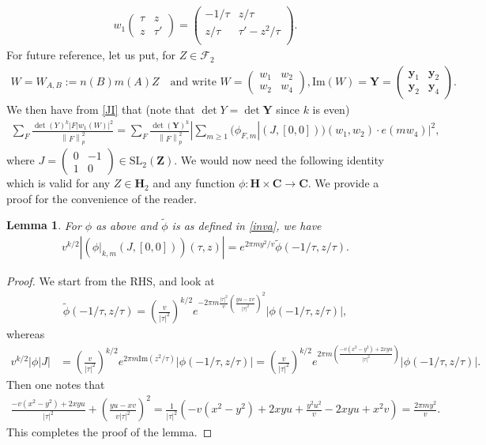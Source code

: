 \documentclass[11pt]{amsart}
\numberwithin{equation}{section}
\theoremstyle{plain}
\newtheorem{lem}[thm]{Lemma}
\theoremstyle{definition}
\newcommand{\mf}{\mathbf}
\newcommand{\mc}{\mathcal}
\newcommand{\mrm}{\mathrm}
\newcommand{\im}{\mrm{Im}}
\newcommand*{\abs}[1]{\left\lvert#1\right\rvert}
\newcommand*{\norm}[1]{\left\lVert#1\right\rVert}
\newcommand{\q}{\quad}
\newcommand{\smat}[4]{\left( \begin{smallmatrix}#1&#2\\#3&#4\end{smallmatrix}\right)}
\newcommand{\pmat}[4]{\begin{pmatrix} #1 & #2 \\ #3 & #4 \\ \end{pmatrix} }
\newcommand{\sltwo}{\mrm{SL}_2(\mf Z)}
\newcommand{\my}{\mf y}
\begin{document}
\begin{align}
     w_1 \begin{pmatrix}
\tau & z \\ z & \tau'
\end{pmatrix} = \pmat{- 1/\tau }{z/\tau}{z/\tau}{\tau'- z^2/\tau}.\label{JI}
\end{align}
For future reference, let us put, for $Z \in \mc F_2$
\begin{align}
    W = W_{A,B} := n(B) m(A) Z \q \text{and write  } W = \smat{w_1}{w_2}{w_2}{w_4}, \im(W)= \mf Y = \smat{\my_1}{\my_2}{\my_2}{\my_4}  .
\end{align}
We then have from \eqref{JI} that (note that $\det Y = \det \mf Y$ since $k$ is even)
\begin{align} \label{FtoFJ}
\sum_F \frac{\det(Y)^k |F|w_1(W)|^2}{\norm{F}^2_p} = \sum_F \frac{\det(\mf Y)^k}{\norm{F}^2_p} |\sum_{m \ge 1} (\phi_{F,m} |(J, [0,0]))(w_1,w_2) \cdot e(m w_4)|^2 ,
\end{align}
where $J=\smat{0}{-1}{1}{0}\in\sltwo$.
We would now need the following identity which is valid for any $ Z \in \mf H_2 $ and any function $\phi \colon \mf H \times \mf C \rightarrow \mf C$. We provide a proof for the convenience of the reader.
\begin{lem}
For $\phi$ as above and $\tilde{\phi}$ is as defined in \eqref{inva}, we have
\begin{align} \label{jeqiuvariance}
    v^{k/2} \abs{(\phi|_{k,m}(J, [0,0]))(\tau, z)} = e^{2\pi my^2/v} \widetilde{\phi}(-1/\tau, z/\tau).
\end{align}
\end{lem}
\begin{proof}
    We start from the RHS, and look at
\begin{align}
    \widetilde{\phi}(-1/\tau, z/\tau) = (\frac{v}{|\tau|^2})^{k/2} e^{- 2 \pi m \frac{|\tau|^2}{v} (\frac{yu-xv}{|\tau|^2})^2 } |\phi(-1/\tau,z/\tau)|,
\end{align}
whereas
\begin{align}
    v^{k/2} \left|\phi | J\right| &=  (\frac{v}{|\tau|^2})^{k/2} e^{2 \pi m \im (z^2/\tau)} |\phi(-1/\tau,z/\tau)| = (\frac{v}{|\tau|^2})^{k/2} e^{2 \pi m  (\frac{-v(x^2-y^2) + 2xyu}{|\tau|^2} ) } |\phi(-1/\tau,z/\tau)|.
\end{align}
Then one notes that
\begin{align*}
    \frac{-v(x^2-y^2) + 2xyu}{|\tau|^2} + (\frac{yu-xv}{v|\tau|^2})^2 = \frac{1}{|\tau|^2} (-v(x^2-y^2) + 2xyu + \frac{y^2 u^2}{v} - 2 xyu + x^2 v   ) = \frac{2 \pi m y^2}{v}.
\end{align*}
This completes the proof of the lemma.
\end{proof}
%
\end{document}
